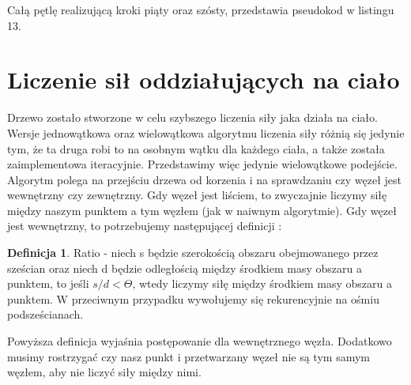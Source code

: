\documentclass[14pt,twoside,a4paper]{article}
\theoremstyle{definition}
\newtheorem{definition}{Definicja}[section]
\begin{document}
Całą pętlę realizującą kroki piąty oraz szósty, przedstawia pseudokod w listingu 13.

\section{\LARGE Liczenie sił oddziałujących na ciało}

Drzewo zostało stworzone w celu szybszego liczenia siły jaka działa na ciało.\\
Wersje jednowątkowa oraz wielowątkowa algorytmu liczenia siły różnią się jedynie tym, że ta druga robi to na osobnym wątku dla każdego ciała, a także została zaimplementowa iteracyjnie. Przedstawimy więc jedynie wielowątkowe podejście. \\
Algorytm polega na przejściu drzewa od korzenia i na sprawdzaniu czy węzeł jest wewnętrzny czy zewnętrzny. Gdy węzeł jest liściem, to zwyczajnie liczymy siłę między naszym punktem a tym węzłem (jak w naiwnym algorytmie). Gdy węzeł jest wewnętrzny, to potrzebujemy następującej definicji \cite{Aarseth}:

\theoremstyle{definition}
\begin{definition}{Ratio}
- niech s będzie szerokością obszaru obejmowanego przez sześcian oraz niech d będzie odległością między środkiem masy obszaru a punktem, to jeśli $s/d < \Theta$, wtedy liczymy siłę między środkiem masy obszaru a punktem. W przeciwnym przypadku wywołujemy się rekurencyjnie na ośmiu podsześcianach.
\end{definition}

Powyższa definicja wyjaśnia postępowanie dla wewnętrznego węzła. Dodatkowo musimy rostrzygać czy nasz punkt i przetwarzany węzeł nie są tym samym węzłem, aby nie liczyć siły między nimi.\\~\\~\\
\end{document}
